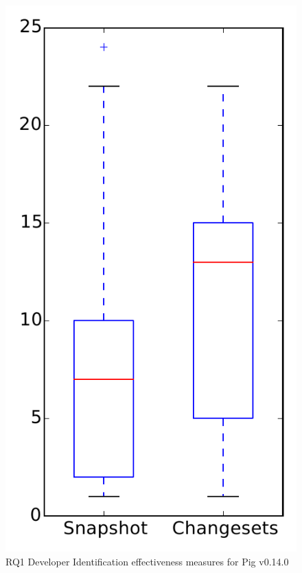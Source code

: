 
\begin{figure}
\centering
\includegraphics[height=0.4\textheight]{figures/dit/rq1_pig}
\caption{RQ1 Developer Identification effectiveness measures for Pig v0.14.0}
\label{fig:dit:rq1:pig}
\end{figure}
